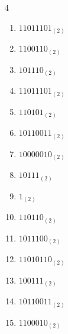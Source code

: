 \begin{multicols}{4}
\begin{enumerate}
        \phantom{$=242$}

  \item $11011101_{(2)}$

        \phantom{$=221$}

\columnbreak %

  \item $1100110_{(2)}$

        \phantom{$=102$}

  \item $101110_{(2)}$

        \phantom{$=46$}

  \item $11011101_{(2)}$

        \phantom{$=221$}

  \item $110101_{(2)}$

        \phantom{$=53$}

  \item $10110011_{(2)}$

        \phantom{$=179$}

  \item $10000010_{(2)}$

        \phantom{$=130$}

  \item $10111_{(2)}$

        \phantom{$=23$}

  \item $1_{(2)}$

        \phantom{$=1$}

  \item $110110_{(2)}$

        \phantom{$=54$}

  \item $1011100_{(2)}$

        \phantom{$=92$}

  \item $11010110_{(2)}$

        \phantom{$=214$}

  \item $100111_{(2)}$

        \phantom{$=39$}

  \item $10110011_{(2)}$

        \phantom{$=179$}

  \item $1100010_{(2)}$


\end{enumerate}
\end{multicols}

